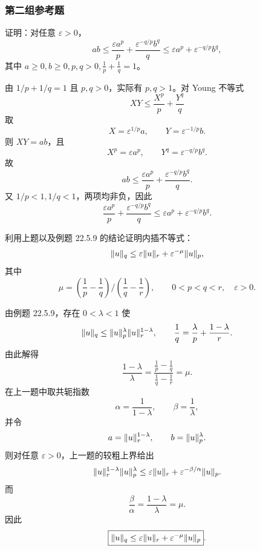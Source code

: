 \subsubsection*{第二组参考题}

\begin{xreferenceproblem}[1]
证明：对任意 $\varepsilon>0$，
  \[
    ab\le\frac{\varepsilon a^p}{p}+\frac{\varepsilon^{-q/p}b^q}{q}
    \le\varepsilon a^p+\varepsilon^{-q/p}b^q,
  \]
  其中 $a\ge0,b\ge0,p,q>0,\frac1p+\frac1q=1$。
\end{xreferenceproblem}
\begin{xsolution}
由 $1/p+1/q=1$ 且 $p,q>0$，实际有 $p,q>1$。对 Young 不等式
\[
  XY\le\frac{X^p}{p}+\frac{Y^q}{q}
\]
取
\[
  X=\varepsilon^{1/p}a,
  \qquad
  Y=\varepsilon^{-1/p}b.
\]
则 $XY=ab$，且
\[
  X^p=\varepsilon a^p,
  \qquad
  Y^q=\varepsilon^{-q/p}b^q.
\]
故
\[
  ab\le\frac{\varepsilon a^p}{p}
  +\frac{\varepsilon^{-q/p}b^q}{q}.
\]
又 $1/p<1,1/q<1$，两项均非负，因此
\[
  \frac{\varepsilon a^p}{p}
  +\frac{\varepsilon^{-q/p}b^q}{q}
  \le\varepsilon a^p+\varepsilon^{-q/p}b^q.
\]
\end{xsolution}


\begin{xreferenceproblem}[2]
利用上题以及例题 22.5.9 的结论证明内插不等式：
  \[
    \lVert u\rVert_q\le\varepsilon\lVert u\rVert_r+\varepsilon^{-\mu}\lVert u\rVert_p,
  \]
  其中
  \[
    \mu=\left(\frac1p-\frac1q\right)\bigg/\left(\frac1q-\frac1r\right),
    \qquad0<p<q<r,\quad\varepsilon>0.
  \]
\end{xreferenceproblem}
\begin{xsolution}
由例题 22.5.9，存在 $0<\lambda<1$ 使
\[
  \lVert u\rVert_q\le\lVert u\rVert_p^\lambda\lVert u\rVert_r^{1-\lambda},
  \qquad
  \frac1q=\frac\lambda p+\frac{1-\lambda}{r}.
\]
由此解得
\[
  \frac{1-\lambda}{\lambda}
  =\frac{\frac1p-\frac1q}{\frac1q-\frac1r}
  =\mu.
\]
在上一题中取共轭指数
\[
  \alpha=\frac1{1-\lambda},
  \qquad
  \beta=\frac1\lambda,
\]
并令
\[
  a=\lVert u\rVert_r^{1-\lambda},
  \qquad
  b=\lVert u\rVert_p^\lambda.
\]
则对任意 $\varepsilon>0$，上一题的较粗上界给出
\[
  \lVert u\rVert_r^{1-\lambda}\lVert u\rVert_p^\lambda
  \le\varepsilon\lVert u\rVert_r
  +\varepsilon^{-\beta/\alpha}\lVert u\rVert_p.
\]
而
\[
  \frac\beta\alpha=\frac{1-\lambda}{\lambda}=\mu.
\]
因此
\[
  \boxed{\lVert u\rVert_q\le\varepsilon\lVert u\rVert_r
  +\varepsilon^{-\mu}\lVert u\rVert_p}.
\]
\end{xsolution}


